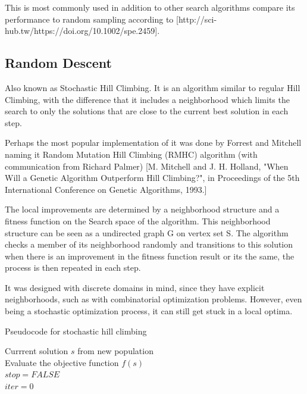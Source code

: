 This is most commonly used in addition to other search algorithms compare its performance to random sampling according to [http://sci-hub.tw/https://doi.org/10.1002/spe.2459].

\subsection{Random Descent} 

Also known as Stochastic Hill Climbing. It is an algorithm similar to regular Hill Climbing, with the difference that it includes a neighborhood which limits the search to only the solutions that are close to the current best solution in each step.

Perhaps the most popular implementation of it was done by Forrest and Mitchell naming it Random Mutation Hill Climbing (RMHC) algorithm (with communication from Richard Palmer) [M. Mitchell and J. H. Holland, "When Will a Genetic Algorithm Outperform Hill Climbing?", in Proceedings of the 5th International Conference on Genetic Algorithms, 1993.]

The local improvements are determined by a neighborhood structure and a fitness function on the Search space of the algorithm. This neighborhood structure can be seen as a undirected graph G on vertex set S. The algorithm checks a member of its neighborhood randomly and transitions to this solution when there is an improvement in the fitness function result or its the same, the process is then repeated in each step.

It was designed with discrete domains in mind, since they have explicit neighborhoods, such as with combinatorial optimization problems. However, even being a stochastic optimization process, it can still get stuck in a local optima.

\begin{algorithm}[H]
\label{evolution_alg}
\caption{Pseudocode for stochastic hill climbing}
\SetAlgoLined
    Currrent solution $s$ from new population\;\\
    Evaluate the objective function $f(s)$\;\\
    $stop = \textit{FALSE}$\;\\
    $iter = 0$\;\\
\end{algorithm}

